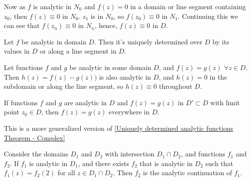 \documentclass[12pt, english]{book}
\makeatletter
\renewenvironment{proof}[1][\proofname]{\par
	\pushQED{\qed}%
	\normalfont \topsep6\p@\@plus6\p@\relax
	\list{}{%
		\settowidth{\leftmargin}{\itshape\proofname:\hskip\labelsep}%
		\setlength{\labelwidth}{0pt}%
		\setlength{\itemindent}{-\leftmargin}%
	}%
	\item[\hskip\labelsep\itshape#1\@addpunct{:}]\ignorespaces
	}{ \popQED\endlist\@endpefalse}
\makeatother
\begin{document}
\begin{proof}
\begin{figure}[H]
		\end{figure}
		
		Now as \(f\) is analytic in \(N_0\) and \(f(z) = 0\) in a domain or line segment containing \(z_0\), then \(f(z) \equiv 0 \) in \(N_0\). \(z_1\) is in \(N_0\), so \(f(z_0) \equiv 0\) in \(N_1\). Continuing this we can see that \(f(z_n) \equiv 0\) in \(N_n\), hence, \(f(z) \equiv 0\) in \(D\).
	\end{proof}
	
	\begin{theorem}
		\label{Uniquely determined analytic functions Theorem - Complex}
		Let \(f\) be analytic in domain \(D\). Then it's uniquely determined over \(D\) by its values in \(D\) or along a line segment in \(D\).
	\end{theorem}
	\begin{proof}
		Let functions \(f\) and \(g\) be analytic in some domain \(D\), and \(f(z) = g(z)\) \(\forall z \in D\). Then \(h(z) = f(z) - g(z))\) is also analytic in \(D\), and \(h(z) = 0\) in the subdomain or along the line segment, so \(h(z) \equiv 0\) throughout \(D\). 
	\end{proof}

	\begin{theorem} 
		\label{Coincidence Principle Theorem - Complex}
		If functions \(f\) and \(g\) are analytic in \(D\) and \(f(z) = g(z)\) in \(D' \subset D\) with limit point \(z_0 \in D\), then \(f(z) = g(z)\) everywhere in \(D\).
		
		This is a more generalized version of \cref{Uniquely determined analytic functions Theorem - Complex}
	\end{theorem}
	
	
	\begin{definition}
		\label{Analytic continuation of a function Definition - Complex}
		Consider the domains \(D_1\) and \(D_2\) with intersection \(D_1 \cap D_2\), and functions \(f_1\) and \(f_2\). If \(f_1\) is analytic in \(D_1\), and there exists \(f_2\) that is analytic in \(D_2\) such that \(f_1(z) = f_2(2)\) for all \(z \in D_1 \cap D_2\). Then \(f_2\) is the analytic continuation of \(f_1\). 
	\end{definition}
\end{document}
